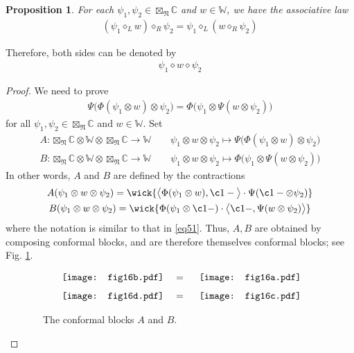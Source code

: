 \documentclass[11pt,b5paper,notitlepage]{article}
\theoremstyle{definition}
\theoremstyle{plain}
\newtheorem{pp}[df]{Proposition}
\newcommand{\Wbb}{\mathbb W}
\newcommand{\Cbb}{\mathbb C}
\newcommand{\<}{\left\langle}
\renewcommand{\>}{\right\rangle}
\newcommand{\fn}{\mathfrak{N}}
\newcommand{\Lan}{{\big\langle}}
\newcommand{\Ran}{{\big\rangle}}
\numberwithin{equation}{section}
\begin{document}
\begin{pp}\label{lb16}
	For each $\psi_1,\psi_2\in \boxtimes_\fn\Cbb$ and $w\in \Wbb$, we have the associative law 
	\begin{align*}
		(\psi_1\diamond_L w)\diamond_R \psi_2=\psi_1\diamond_L(w\diamond_R \psi_2)
	\end{align*}
\end{pp}
Therefore, both sides can be denoted by
\begin{align*}
\psi_1\diamond w\diamond \psi_2
\end{align*}
\begin{proof}
We need to prove
	\begin{align}\label{eq37}
		\Psi\big(\Phi(\psi_1\otimes w)\otimes \psi_2\big)=\Phi\big(\psi_1\otimes \Psi(w\otimes \psi_2)\big)
	\end{align}
for all $\psi_1,\psi_2\in \boxtimes_\fn\Cbb$ and $w\in \Wbb$. Set 
	\begin{gather*}
		A:\boxtimes_\fn\Cbb\otimes \Wbb\otimes \boxtimes_\fn\Cbb\rightarrow \Wbb\qquad \psi_1\otimes w\otimes\psi_2\mapsto \Psi\big(\Phi(\psi_1\otimes w)\otimes \psi_2 \big)\\
		B:\boxtimes_\fn\Cbb\otimes \Wbb\otimes \boxtimes_\fn\Cbb\rightarrow \Wbb\qquad \psi_1\otimes w\otimes\psi_2\mapsto\Phi\big(\psi_1\otimes \Psi(w\otimes \psi_2)\big)
	\end{gather*}
In other words, $A$ and $B$ are defined by the contractions
   \begin{subequations}\label{eq122}
   \begin{gather}
	\label{eq32} A(\psi_1\otimes w\otimes \psi_2)=\wick{\Lan \Phi(\psi_1\otimes w),\c1 -\Ran \cdot \Psi(\c1 -\otimes \psi_2)}\\
	\label{eq33} B(\psi_1\otimes w\otimes \psi_2)=\wick{\Phi(\psi_1\otimes \c1 -)\cdot\Lan \c1 -,\Psi(w\otimes \psi_2)\Ran}
   \end{gather}
\end{subequations}
where the notation is similar to that in \eqref{eq51}. Thus, $A,B$  are obtained by composing conformal blocks, and are therefore themselves conformal blocks; see Fig. \ref{img1}.
\begin{figure}[h]
	\centering
\begin{gather*}
\vcenter{\hbox{{
		   \texttt{[image: fig16b.pdf]}}}}	\quad=\quad\vcenter{\hbox{{
		\texttt{[image: fig16a.pdf]}}}}\\[1ex]
\vcenter{\hbox{{
		   \texttt{[image: fig16d.pdf]}}}}	\quad=\quad	  \vcenter{\hbox{{
		\texttt{[image: fig16c.pdf]}}}}
   \end{gather*}
\caption{~~The conformal blocks $A$ and $B$.}
	\label{img1}
\end{figure}


\end{proof}
\end{document}
